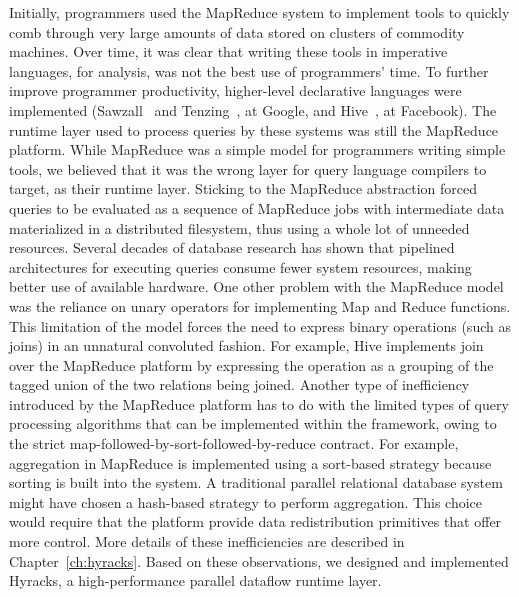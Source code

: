 Initially, programmers used the MapReduce system to implement tools to quickly comb through very large amounts of data stored on clusters of commodity machines. Over time, it was clear that writing these tools in imperative languages, for analysis, was not the best use of programmers' time. To further improve programmer productivity, higher-level declarative languages were implemented (Sawzall~\cite{sawzall} and Tenzing~\cite{tenzing}, at Google, and Hive~\cite{hive}, at Facebook). The runtime layer used to process queries by these systems was still the MapReduce platform. While MapReduce was a simple model for programmers writing simple tools, we believed that it was the wrong layer for query language compilers to target, as their runtime layer. Sticking to the MapReduce abstraction forced queries to be evaluated as a sequence of MapReduce jobs with intermediate data materialized in a distributed filesystem, thus using a whole lot of unneeded resources. Several decades of database research has shown that pipelined architectures for executing queries consume fewer system resources, making better use of available hardware. One other problem with the MapReduce model was the reliance on unary operators for implementing Map and Reduce functions. This limitation of the model forces the need to express binary operations (such as joins) in an unnatural convoluted fashion. For example, Hive implements join over the MapReduce platform by expressing the operation as a grouping of the tagged union of the two relations being joined.
Another type of inefficiency introduced by the MapReduce platform has to do with the limited types of query processing algorithms that can be implemented within the framework, owing to the strict map-followed-by-sort-followed-by-reduce contract. For example, aggregation in MapReduce is implemented using a sort-based strategy because sorting is built into the system. A traditional parallel relational database system might have chosen a hash-based strategy to perform aggregation. This choice would require that the platform provide data redistribution primitives that offer more control. More details of these inefficiencies are described in Chapter~\ref{ch:hyracks}. Based on these observations, we designed and implemented Hyracks, a high-performance parallel dataflow runtime layer.

